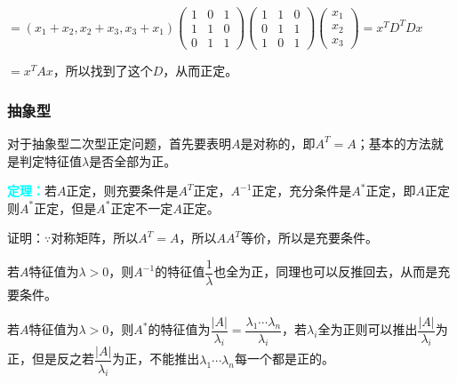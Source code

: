 \documentclass[UTF8, 12pt]{ctexart}
\begin{document}
$=(x_1+x_2,x_2+x_3,x_3+x_1)\left(\begin{array}{ccc}
1 & 0 & 1 \\
1 & 1 & 0 \\
0 & 1 & 1
\end{array}\right)\left(\begin{array}{ccc}
1 & 1 & 0 \\
0 & 1 & 1 \\
1 & 0 & 1
\end{array}\right)\left(\begin{array}{c}
x_1 \\
x_2 \\
x_3
\end{array}\right)=x^TD^TDx$

$=x^TAx$，所以找到了这个$D$，从而正定。

\subsubsection{抽象型}

对于抽象型二次型正定问题，首先要表明$A$是对称的，即$A^T=A$；基本的方法就是判定特征值$\lambda$是否全部为正。

\textcolor{aqua}{\textbf{定理：}}若$A$正定，则充要条件是$A^T$正定，$A^{-1}$正定，充分条件是$A^*$正定，即$A$正定则$A^*$正定，但是$A^*$正定不一定$A$正定。

证明：$\because$对称矩阵，所以$A^T=A$，所以$AA^T$等价，所以是充要条件。

若$A$特征值为$\lambda>0$，则$A^{-1}$的特征值$\dfrac{1}{\lambda}$也全为正，同理也可以反推回去，从而是充要条件。

若$A$特征值为$\lambda>0$，则$A^*$的特征值为$\dfrac{\vert A\vert}{\lambda_i}=\dfrac{\lambda_1\cdots\lambda_n}{\lambda_i}$，若$\lambda_i$全为正则可以推出$\dfrac{\vert A\vert}{\lambda_i}$为正，但是反之若$\dfrac{\vert A\vert}{\lambda_i}$为正，不能推出$\lambda_1\cdots\lambda_n$每一个都是正的。
\end{document}
